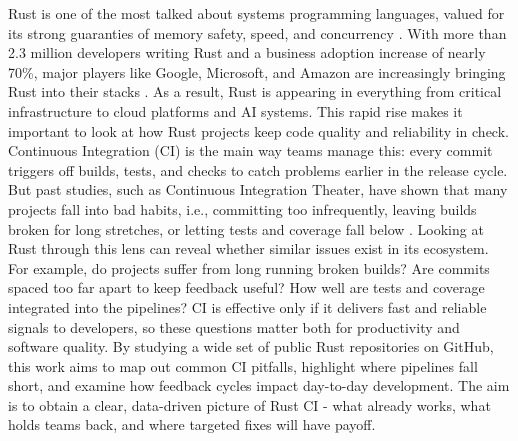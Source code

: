 \documentclass[11pt]{article}
\begin{document}
Rust is one of the most talked about systems programming languages, valued for its strong guaranties of memory safety, speed, and concurrency \autocite{Bugden2022}. With more than 2.3 million developers writing Rust and a business adoption increase of nearly 70\%, major players like Google, Microsoft, and Amazon are increasingly bringing Rust into their stacks \autocite{Schueller2022} \autocite{HBLAB2025}. As a result, Rust is appearing in everything from critical infrastructure to cloud platforms and AI systems. This rapid rise makes it important to look at how Rust projects keep code quality and reliability in check. Continuous Integration (CI) is the main way teams manage this: every commit triggers off builds, tests, and checks to catch problems earlier in the release cycle. But past studies, such as Continuous Integration Theater, have shown that many projects fall into bad habits, i.e., committing too infrequently, leaving builds broken for long stretches, or letting tests and coverage fall below \autocite{felidre2019ci_theater}. Looking at Rust through this lens can reveal whether similar issues exist in its ecosystem. For example, do projects suffer from long running broken builds? Are commits spaced too far apart to keep feedback useful? How well are tests and coverage integrated into the pipelines? CI is effective only if it delivers fast and reliable signals to developers, so these questions matter both for productivity and software quality. By studying a wide set of public Rust repositories on GitHub, this work aims to map out common CI pitfalls, highlight where pipelines fall short, and examine how feedback cycles impact day-to-day development. The aim is to obtain a clear, data-driven picture of Rust CI - what already works, what holds teams back, and where targeted fixes will have payoff.
\end{document}

